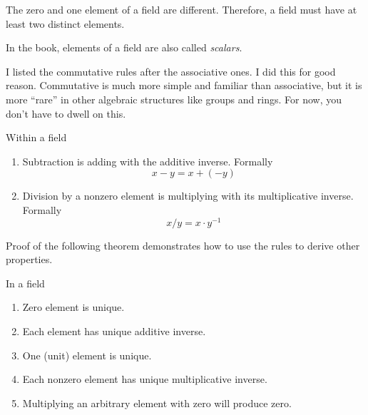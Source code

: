 \begin{note}
    The zero and one element of a field are different. Therefore, a field must have at least two distinct elements.

    In the book, elements of a field are also called \textit{scalars}.

    I listed the commutative rules after the associative ones. I did this for good reason. Commutative is much more simple and familiar than associative, but it is more ``rare'' in other algebraic structures like groups and rings. For now, you don't have to dwell on this.
\end{note}

\begin{definition}
    Within a field
    \begin{enumerate}
        \item Subtraction is adding with the additive inverse. Formally
            \[
                x - y = x + (-y)
            \]
        \item Division by a nonzero element is multiplying with its multiplicative inverse. Formally
            \[
                x / y = x\cdot y^{-1}
            \]
    \end{enumerate}
\end{definition}

Proof of the following theorem demonstrates how to use the rules to derive other properties.

\begin{theorem}\label{thm:properties-of-field}
    In a field
    \begin{enumerate}[label = (\roman*)]
        \item Zero element is unique.
        \item Each element has unique additive inverse.
        \item One (unit) element is unique.
        \item Each nonzero element has unique multiplicative inverse.
        \item Multiplying an arbitrary element with zero will produce zero.
    \end{enumerate}
\end{theorem}

